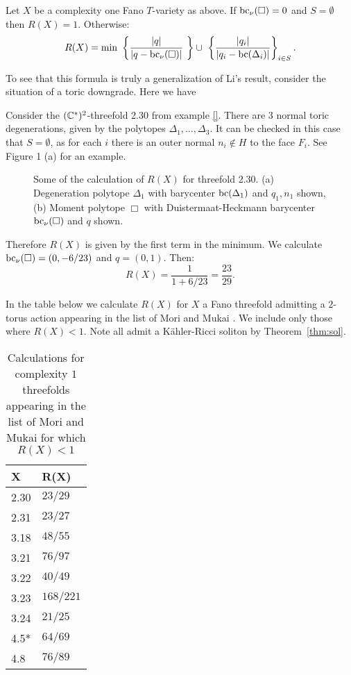 \begin{theorem} \label{thm:R(X)} Let \(X\) be a complexity one Fano \(T\)-variety as above. If \(\mathop{\rm bc}\nolimits_\nu(\Box) = 0\) and \(S = \emptyset\) then \(R(X) = 1\). Otherwise:
\[
R(X) = \min \  \left\lbrace \frac{|q|}{|q-\mathop{\rm bc}\nolimits_\nu(\Box)|}  \ \right\rbrace \cup \ \left\lbrace \frac{|q_i|}{|q_i - \mathop{\rm bc}\nolimits(\Delta_i)|} \right\rbrace_{i \in S} .
\]
\end{theorem}
\begin{remark}
To see that this formula is truly a generalization of Li's result, consider the situation of a toric downgrade. Here we have 
\end{remark}
\begin{example}
Consider the \((\mathbb{C}^*)^2\)-threefold 2.30 from example \ref{}. There are \(3\) normal toric degenerations, given by the polytopes \(\Delta_1,\dots,\Delta_3\). It can be checked in this case that \(S = \emptyset\), as for each \(i\) there is an outer normal \(n_i \not\in H\) to the face \(F_i\). See Figure 1 (a) for an example.
\begin{figure}[H]
	\subcaptionbox{\label{fig2:a}}{\degendiagram}\hfill%
	\subcaptionbox{\label{fig2:b}}{\momentdiagram}%
	\caption{Some of the calculation of $R(X)$ for threefold 2.30. (a) Degeneration polytope $\Delta_1$ with barycenter $\mathop{\rm bc}\nolimits(\Delta_1)$ and $q_1,n_1$ shown, (b) Moment polytope $\Box$ with Duistermaat-Heckmann barycenter $\mathop{\rm bc}\nolimits_\nu(\Box)$ and $q$ shown.}
\end{figure}
Therefore \(R(X)\) is given by the first term in the minimum. We calculate \(\mathop{\rm bc}\nolimits_\nu(\Box)= (0,-6/23)\) and \(q = (0,1)\). Then:
\[
R(X) = \frac{1}{1+ 6/23} = \frac{23}{29}.
\]
\end{example}
\begin{corollary} \label{cor:R(X)}
In the table below we calculate \(R(X)\) for \(X\) a Fano threefold  admitting a \(2\)-torus action appearing in the list of Mori and Mukai \cite{mori1981classification}. We include only those where \(R(X) <1\). Note all admit a K\"ahler-Ricci soliton by Theorem~\ref{thm:sol}.
\end{corollary}
\begin{table}[H] \centering
\captionsetup{width=.95\linewidth}
\caption{Calculations for complexity \(1\) threefolds appearing in the list of Mori and Mukai for which \(R(X) <1\)}
\begin{tabular}{l l}
\hline
X & R(X) \\
\hline
2.30 & \(23/29\) \\
2.31 & \(23/27\) \\
3.18 & \(48/55\) \\
3.21 & \(76/97\) \\
3.22 & \(40/49\) \\
3.23 & \(168/221\) \\
3.24 & \(21/25\) \\
4.5* & \(64/69\) \\
4.8 & \(76/89\) \\
\hline
\end{tabular}
\label{table:name}
\end{table}
